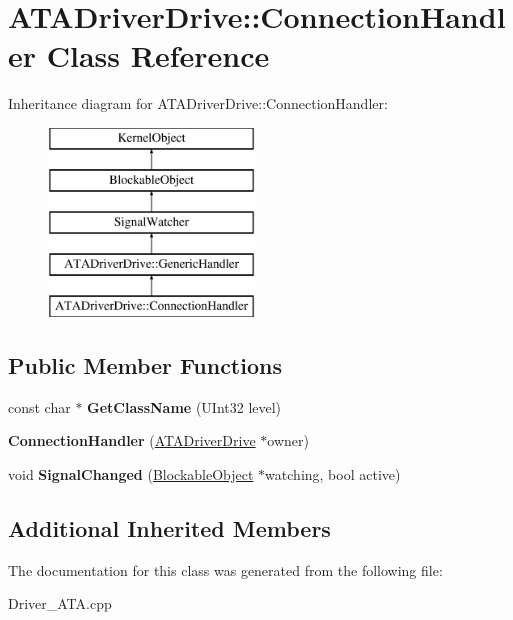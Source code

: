 \hypertarget{class_a_t_a_driver_drive_1_1_connection_handler}{}\section{A\+T\+A\+Driver\+Drive\+:\+:Connection\+Handler Class Reference}
\label{class_a_t_a_driver_drive_1_1_connection_handler}
Inheritance diagram for A\+T\+A\+Driver\+Drive\+:\+:Connection\+Handler\+:\begin{figure}[H]
\begin{center}
\leavevmode
\includegraphics[height=5.000000cm]{class_a_t_a_driver_drive_1_1_connection_handler}
\end{center}
\end{figure}
\subsection*{Public Member Functions}
\begin{DoxyCompactItemize}
\item 
\mbox{\label{class_a_t_a_driver_drive_1_1_connection_handler_add4de1606eee6dfb3bf70f21aa97bc52}} 
const char $\ast$ {\bfseries Get\+Class\+Name} (U\+Int32 level)
\item 
\mbox{\label{class_a_t_a_driver_drive_1_1_connection_handler_a2607b94166f4b8771d2206aaff8be7f0}} 
{\bfseries Connection\+Handler} (\hyperlink{class_a_t_a_driver_drive}{A\+T\+A\+Driver\+Drive} $\ast$owner)
\item 
\mbox{\label{class_a_t_a_driver_drive_1_1_connection_handler_a3be6e60ed10d56d85de958e9374871d4}} 
void {\bfseries Signal\+Changed} (\hyperlink{class_blockable_object}{Blockable\+Object} $\ast$watching, bool active)
\end{DoxyCompactItemize}
\subsection*{Additional Inherited Members}


The documentation for this class was generated from the following file\+:\begin{DoxyCompactItemize}
\item 
Driver\+\_\+\+A\+T\+A.\+cpp\end{DoxyCompactItemize}
